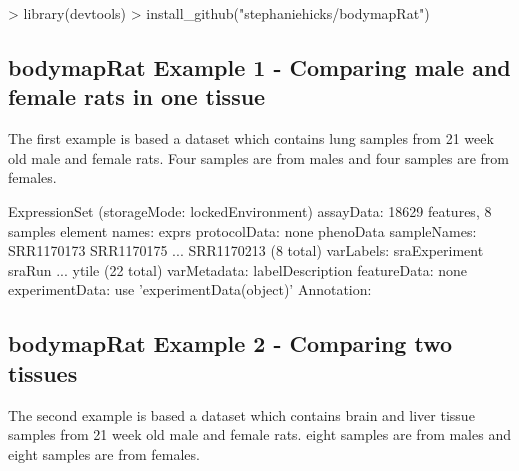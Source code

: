 \documentclass{article}
\begin{document}
\begin{Schunk}
\begin{Sinput}
> library(devtools)
> install_github("stephaniehicks/bodymapRat")
\end{Sinput}
\end{Schunk}


\subsection{bodymapRat Example 1 - Comparing male and female rats in one tissue}

The first example is based a dataset
which contains lung samples from 21 week old male and female rats.
Four samples are from males and four samples are from females.

\begin{Schunk}
\begin{Soutput}
ExpressionSet (storageMode: lockedEnvironment)
assayData: 18629 features, 8 samples 
  element names: exprs 
protocolData: none
phenoData
  sampleNames: SRR1170173 SRR1170175 ... SRR1170213 (8 total)
  varLabels: sraExperiment sraRun ... ytile (22 total)
  varMetadata: labelDescription
featureData: none
experimentData: use 'experimentData(object)'
Annotation:  
\end{Soutput}
\end{Schunk}

\subsection{bodymapRat Example 2 - Comparing two tissues}

The second example is based a dataset which contains brain and liver
tissue samples from 21 week old male and female rats.
eight samples are from males and eight samples are from females.
\end{document}
